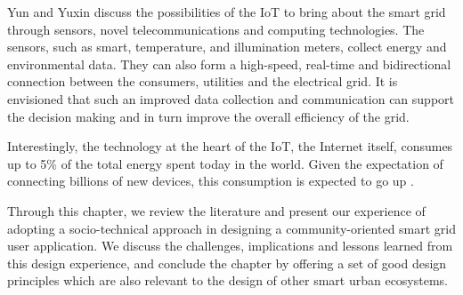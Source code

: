 Yun and Yuxin \cite{yun2010research} discuss the possibilities of the IoT to bring about the smart grid through sensors, novel telecommunications and computing technologies. The sensors, such as smart, temperature, and illumination meters, collect energy and environmental data. They can also form a high-speed, real-time and bidirectional connection between the consumers, utilities and the electrical grid. It is envisioned that such an improved data collection and communication can support the decision making and in turn improve the overall efficiency of the grid. 

Interestingly, the technology at the heart of the IoT, the Internet itself, consumes up to 5\% of the total energy spent today in the world. Given the expectation of connecting billions of new devices, this consumption is expected to go up \cite{gubbi2013internet}.	

\begin{svgraybox}
Through this chapter, we review the literature and present our experience of adopting a socio-technical approach in designing a community-oriented smart grid user application. We discuss the challenges, implications and lessons learned from this design experience, and conclude the chapter by offering a set of good design principles which are also relevant to the design of other smart urban ecosystems. 

\end{svgraybox}
